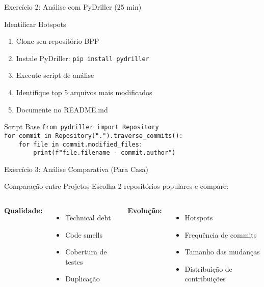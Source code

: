 \documentclass[aspectratio=169,11pt]{beamer}
\begin{document}
\begin{frame}{Exercício 2: Análise com PyDriller (25 min)}
\begin{block}{ Identificar Hotspots}
\begin{enumerate}
    \item Clone seu repositório BPP
    \item Instale PyDriller: \texttt{pip install pydriller}
    \item Execute script de análise
    \item Identifique top 5 arquivos mais modificados
    \item Documente no README.md
\end{enumerate}
\end{block}

\begin{exampleblock}{ Script Base}
\scriptsize
\texttt{from pydriller import Repository} \\
\texttt{for commit in Repository(".").traverse\_commits():} \\
\texttt{\ \ \ \ for file in commit.modified\_files:} \\
\texttt{\ \ \ \ \ \ \ \ print(f"{file.filename} - {commit.author}")}
\end{exampleblock}
\end{frame}

\begin{frame}{Exercício 3: Análise Comparativa (Para Casa)}
\begin{block}{ Comparação entre Projetos}
Escolha 2 repositórios populares e compare:

\begin{columns}[T]
\textbf{Qualidade:}
\begin{itemize}
    \item Technical debt
    \item Code smells
    \item Cobertura de testes
    \item Duplicação
\end{itemize}

\textbf{Evolução:}
\begin{itemize}
    \item Hotspots
    \item Frequência de commits
    \item Tamanho das mudanças
    \item Distribuição de contribuições
\end{itemize}
\end{columns}
\end{block}
\end{frame}
\end{document}
